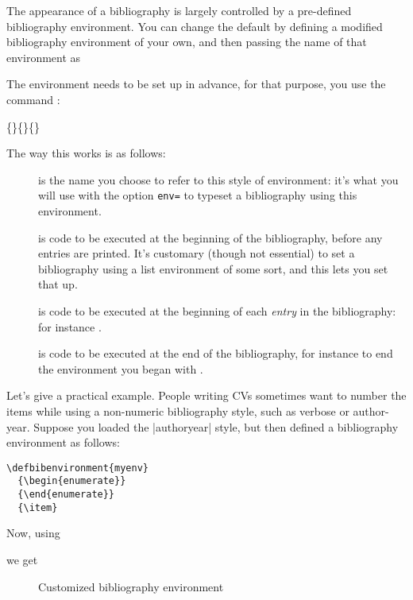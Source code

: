 The appearance of a bibliography is largely controlled by a
pre-defined bibliography environment. You can change the default by
defining a modified bibliography environment of your own, and then
passing the name of that environment as
\begin{center}
\end{center}

The environment needs to be set up in advance, for that purpose, you
use the command :
\begin{center}
\{\}\{\}\{\}
\end{center}

The way this works is as follows:
\begin{description}
\item[] is the name you choose to refer to this style of
  environment: it's what you will use with the option \texttt{env=} to
  typeset a bibliography using this environment.
\item[] is code to be executed at the beginning of the
  bibliography, before any entries are printed. It's customary (though
  not essential) to set a bibliography using a list environment of
  some sort, and this lets you set that up.
\item[] is code to be executed at the beginning of each
  \emph{entry} in the bibliography: for instance .
\item[] is code to be executed at the end of the
  bibliography, for instance to end the environment you began with
  .
\end{description}

Let's give a practical example. People writing CVs sometimes want to
number the items while using a non-numeric bibliography style, such as
verbose or author-year. Suppose you loaded the |authoryear| style, but
then defined a bibliography environment as follows:
\begin{verbatim}
\defbibenvironment{myenv}
  {\begin{enumerate}}
  {\end{enumerate}}
  {\item}
\end{verbatim}
Now, using
\begin{pseudoverb}
\relax[env=myenv,heading=myheading]
\end{pseudoverb}
we get

\begin{figure}
\caption{Customized bibliography environment\label{custom-env}}
\end{figure}

